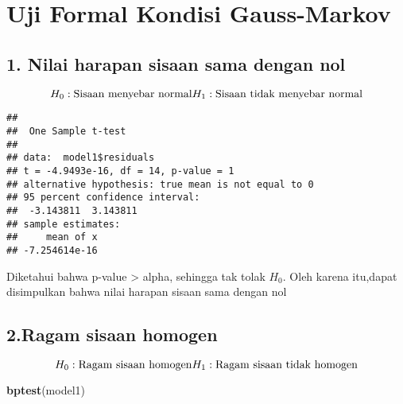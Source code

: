 \documentclass[
]{article}
\newenvironment{Shaded}{\begin{snugshade}}{\end{snugshade}}
\newcommand{\AttributeTok}[1]{\textcolor[rgb]{0.13,0.29,0.53}{#1}}
\newcommand{\DecValTok}[1]{\textcolor[rgb]{0.00,0.00,0.81}{#1}}
\newcommand{\FloatTok}[1]{\textcolor[rgb]{0.00,0.00,0.81}{#1}}
\newcommand{\FunctionTok}[1]{\textcolor[rgb]{0.13,0.29,0.53}{\textbf{#1}}}
\newcommand{\NormalTok}[1]{#1}
\newcommand{\SpecialCharTok}[1]{\textcolor[rgb]{0.81,0.36,0.00}{\textbf{#1}}}
\begin{document}
\hypertarget{uji-formal-kondisi-gauss-markov}{%
\section{Uji Formal Kondisi
Gauss-Markov}\label{uji-formal-kondisi-gauss-markov}}

\hypertarget{nilai-harapan-sisaan-sama-dengan-nol}{%
\subsection{1. Nilai harapan sisaan sama dengan
nol}\label{nilai-harapan-sisaan-sama-dengan-nol}}

\[
H_0 : \text{Sisaan menyebar normal}\\H_1 : \text{Sisaan tidak menyebar normal}
\]

\begin{Shaded}
\end{Shaded}

\begin{verbatim}
## 
##  One Sample t-test
## 
## data:  model1$residuals
## t = -4.9493e-16, df = 14, p-value = 1
## alternative hypothesis: true mean is not equal to 0
## 95 percent confidence interval:
##  -3.143811  3.143811
## sample estimates:
##     mean of x 
## -7.254614e-16
\end{verbatim}

Diketahui bahwa p-value \textgreater{} alpha, sehingga tak tolak
\(H_0\). Oleh karena itu,dapat disimpulkan bahwa nilai harapan sisaan
sama dengan nol

\hypertarget{ragam-sisaan-homogen}{%
\subsection{2.Ragam sisaan homogen}\label{ragam-sisaan-homogen}}

\[
H_0 : \text{Ragam sisaan homogen}\\H_1 : \text{Ragam sisaan tidak homogen}
\]

\begin{Shaded}
\begin{Highlighting}[]
\FunctionTok{bptest}\NormalTok{(model1)}
\end{Highlighting}
\end{Shaded}
\end{document}
